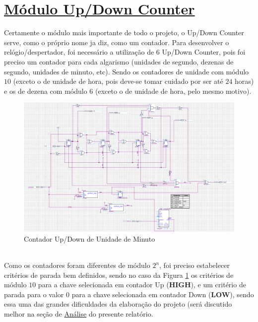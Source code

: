 \documentclass[14pt, oneside]{book}
\newcommand\tab[1][1cm]{\hspace*{#1}}
\theoremstyle{definition}
\begin{document}
            \section[Módulo Up/Down Counter]{\hyperlink{toc}{Módulo Up/Down Counter}}
                \tab Certamente o módulo mais importante de todo o projeto, o Up/Down Counter serve, como o próprio nome ja diz, como um contador. Para desenvolver o relógio/despertador, foi necessário a utilização de $6$ Up/Down Counter, pois foi preciso um contador para cada algarismo (unidades de segundo, dezenas de segundo, unidades de minuto, etc). Sendo os contadores de unidade com módulo $10$ (exceto o de unidade de hora, pois deve-se tomar cuidado por ser até $24$ horas) e os de dezena com módulo $6$ (exceto o de unidade de hora, pelo mesmo motivo). \\
                \begin{figure}[!h]
                    \centering
                    \includegraphics[scale = 0.5]{contadorupdownum.png}
                    \caption{Contador Up/Down de Unidade de Minuto}
                    \label{fig:unidadesegundo}
                \end{figure} \\
                \tab Como os contadores foram diferentes de módulo $2^n$, foi preciso estabelecer critérios de parada bem definidos, sendo no caso da Figura \ref{fig:unidadesegundo} os critérios de módulo $10$ para a chave selecionada em contador Up (\textbf{HIGH}), e um critério de parada para o valor $0$ para a chave selecionada em contador Down (\textbf{LOW}), sendo essa uma das grandes dificuldades da elaboração do projeto (será discutido melhor na seção de \hyperlink{ana}{Análise} do presente relatório.
                
\end{document}
